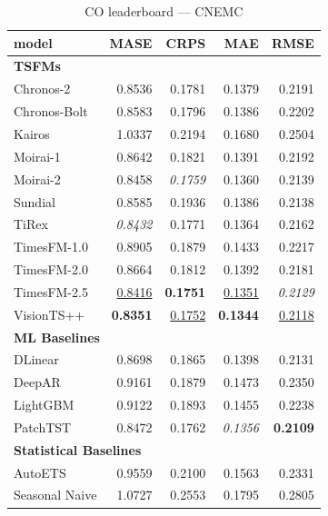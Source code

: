 \begin{table}[H]
\caption{CO leaderboard --- CNEMC}
\centering
\begin{small}
\begin{tabular}{lrrrr}
\toprule
model & MASE & CRPS & MAE & RMSE \\
\midrule
\multicolumn{5}{l}{\textbf{TSFMs}} \\
Chronos-2 & 0.8536 & 0.1781 & 0.1379 & 0.2191 \\
Chronos-Bolt & 0.8583 & 0.1796 & 0.1386 & 0.2202 \\
Kairos & 1.0337 & 0.2194 & 0.1680 & 0.2504 \\
Moirai-1 & 0.8642 & 0.1821 & 0.1391 & 0.2192 \\
Moirai-2 & 0.8458 & \textit{0.1759} & 0.1360 & 0.2139 \\
Sundial & 0.8585 & 0.1936 & 0.1386 & 0.2138 \\
TiRex & \textit{0.8432} & 0.1771 & 0.1364 & 0.2162 \\
TimesFM-1.0 & 0.8905 & 0.1879 & 0.1433 & 0.2217 \\
TimesFM-2.0 & 0.8664 & 0.1812 & 0.1392 & 0.2181 \\
TimesFM-2.5 & \underline{0.8416} & \textbf{0.1751} & \underline{0.1351} & \textit{0.2129} \\
VisionTS++ & \textbf{0.8351} & \underline{0.1752} & \textbf{0.1344} & \underline{0.2118} \\
\midrule
\multicolumn{5}{l}{\textbf{ML Baselines}} \\
DLinear & 0.8698 & 0.1865 & 0.1398 & 0.2131 \\
DeepAR & 0.9161 & 0.1879 & 0.1473 & 0.2350 \\
LightGBM & 0.9122 & 0.1893 & 0.1455 & 0.2238 \\
PatchTST & 0.8472 & 0.1762 & \textit{0.1356} & \textbf{0.2109} \\
\midrule
\multicolumn{5}{l}{\textbf{Statistical Baselines}} \\
AutoETS & 0.9559 & 0.2100 & 0.1563 & 0.2331 \\
Seasonal Naive & 1.0727 & 0.2553 & 0.1795 & 0.2805 \\
\bottomrule
\end{tabular}
\end{small}
\end{table}